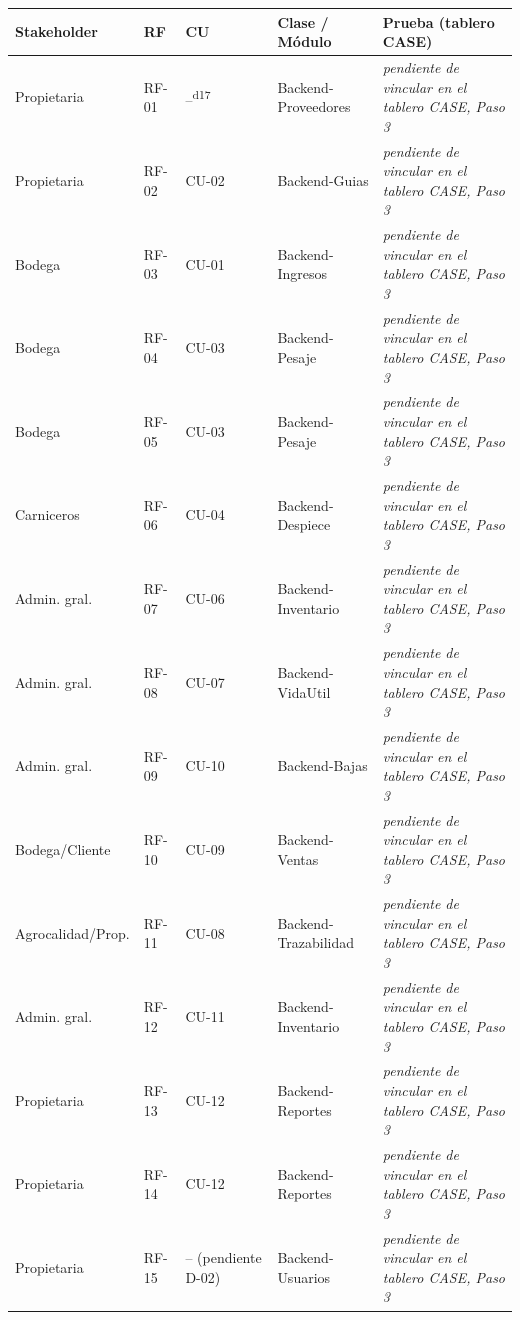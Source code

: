 \documentclass[11pt,a4paper]{article}
\begin{document}
\begin{longtable}{|p{2.6cm}|p{1.3cm}|p{2.3cm}|p{2.6cm}|p{2.9cm}|}
\hline
\textbf{Stakeholder} & \textbf{RF} & \textbf{CU} & \textbf{Clase / Módulo} & \textbf{Prueba (tablero CASE)} \\
\hline
Propietaria & RF-01 & --\textsuperscript{d17} & Backend-Proveedores & \textit{pendiente de vincular en el tablero CASE, Paso 3} \\
\hline
Propietaria & RF-02 & CU-02 & Backend-Guias & \textit{pendiente de vincular en el tablero CASE, Paso 3} \\
\hline
Bodega & RF-03 & CU-01 & Backend-Ingresos & \textit{pendiente de vincular en el tablero CASE, Paso 3} \\
\hline
Bodega & RF-04 & CU-03 & Backend-Pesaje & \textit{pendiente de vincular en el tablero CASE, Paso 3} \\
\hline
Bodega & RF-05 & CU-03 & Backend-Pesaje & \textit{pendiente de vincular en el tablero CASE, Paso 3} \\
\hline
Carniceros & RF-06 & CU-04 & Backend-Despiece & \textit{pendiente de vincular en el tablero CASE, Paso 3} \\
\hline
Admin. gral. & RF-07 & CU-06 & Backend-Inventario & \textit{pendiente de vincular en el tablero CASE, Paso 3} \\
\hline
Admin. gral. & RF-08 & CU-07 & Backend-VidaUtil & \textit{pendiente de vincular en el tablero CASE, Paso 3} \\
\hline
Admin. gral. & RF-09 & CU-10 & Backend-Bajas & \textit{pendiente de vincular en el tablero CASE, Paso 3} \\
\hline
Bodega/Cliente & RF-10 & CU-09 & Backend-Ventas & \textit{pendiente de vincular en el tablero CASE, Paso 3} \\
\hline
Agrocalidad/Prop. & RF-11 & CU-08 & Backend-Trazabilidad & \textit{pendiente de vincular en el tablero CASE, Paso 3} \\
\hline
Admin. gral. & RF-12 & CU-11 & Backend-Inventario & \textit{pendiente de vincular en el tablero CASE, Paso 3} \\
\hline
Propietaria & RF-13 & CU-12 & Backend-Reportes & \textit{pendiente de vincular en el tablero CASE, Paso 3} \\
\hline
Propietaria & RF-14 & CU-12 & Backend-Reportes & \textit{pendiente de vincular en el tablero CASE, Paso 3} \\
\hline
Propietaria & RF-15 & -- (pendiente D-02) & Backend-Usuarios & \textit{pendiente de vincular en el tablero CASE, Paso 3} \\

\end{longtable}
\end{document}
